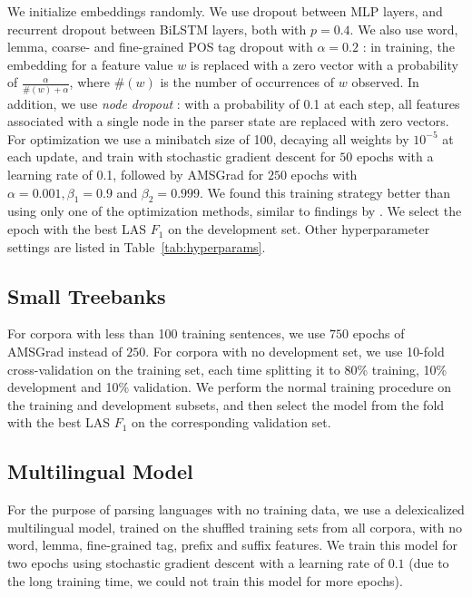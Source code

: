 \documentclass[11pt,a4paper]{article}
\begin{document}
We initialize embeddings randomly.
We use dropout \cite{srivastava2014dropout} between MLP layers, and recurrent dropout
\cite{NIPS2016_6241} between BiLSTM layers, both with $p=0.4$.
We also use word, lemma, coarse- and fine-grained POS tag dropout
with $\alpha=0.2$
\cite{kiperwasser2016simple}: in training, the embedding for a feature value
$w$ is replaced with a zero vector with a probability of
$\frac{\alpha}{\#(w)+\alpha}$,
where $\#(w)$ is the number of occurrences of $w$ observed.
In addition, we use \textit{node dropout} \cite{hershcovich2018multitask}:
with a probability of 0.1 at each step, all features associated with a single
node in the parser state are replaced with zero vectors.
For optimization we use a minibatch size of 100, decaying all weights by $10^{-5}$ at each update,
and train with stochastic gradient descent for $50$ epochs with a learning
rate of 0.1, followed by AMSGrad \cite{j.2018on} for $250$ epochs with
$\alpha=0.001,\beta_1=0.9$ and $\beta_2=0.999$.
We found this training strategy better than using only one of the optimization methods,
similar to findings by \citet{keskar2017improving}.
We select the epoch with the best LAS $F_1$ on the
development set.
Other hyperparameter settings are listed in Table~\ref{tab:hyperparams}.

\subsection{Small Treebanks}

For corpora with less than 100 training sentences,
we use $750$ epochs of AMSGrad instead of $250$.
For corpora with no development set,
we use 10-fold cross-validation on the training set,
each time splitting it to 80\% training, 10\% development and 10\% validation.
We perform the normal training procedure on the training and development
subsets, and then select the model from the fold with the best LAS $F_1$
on the corresponding validation set.

\subsection{Multilingual Model}

For the purpose of parsing languages with no training data,
we use a delexicalized multilingual model, trained on the shuffled training sets
from all corpora, with no word, lemma, fine-grained tag, prefix and suffix features.
We train this model for two epochs using stochastic gradient descent
with a learning rate of $0.1$
(due to the long training time, we could not train this model for more epochs).
\end{document}
